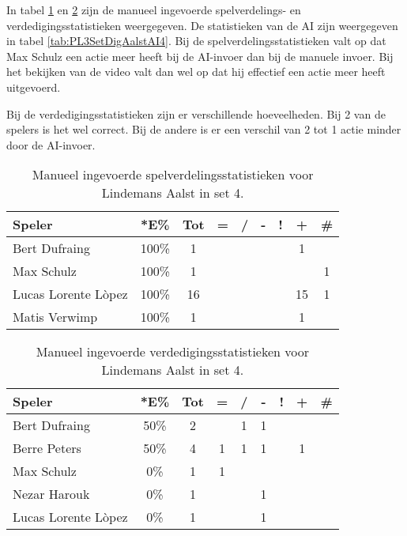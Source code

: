 In tabel \ref{tab:PL3SetAalstMan4} en \ref{tab:PL3DigAalstMan4} zijn de manueel ingevoerde spelverdelings- en verdedigingsstatistieken weergegeven. De statistieken van de AI zijn weergegeven in tabel \ref{tab:PL3SetDigAalstAI4}.
Bij de spelverdelingsstatistieken valt op dat Max Schulz een actie meer heeft bij de AI-invoer dan bij de manuele invoer. Bij het bekijken van de video valt dan wel op dat hij effectief een actie meer heeft uitgevoerd. 

Bij de verdedigingsstatistieken zijn er verschillende hoeveelheden. Bij 2 van de spelers is het wel correct. Bij de andere is er een verschil van 2 tot 1 actie minder door de AI-invoer.

\begin{table}[ht!]
    \centering
    \scriptsize
    \begin{tabular}{|l|c|c|c|c|c|c|c|c|}
        \hline
        \textbf{Speler} & *E\% & Tot & = & / & - & ! & + & \# \\ \hline
        Bert Dufraing & 100\% & 1 &  &  &  & & 1 &  \\ 
        Max Schulz & 100\% & 1 &  &  &  & & & 1 \\ 
        Lucas Lorente Lòpez & 100\% & 16 &  &  &  &  & 15 & 1 \\ 
        Matis Verwimp &100\% & 1 & & & & & 1 & \\\hline
    \end{tabular}
    \caption[Manueel ingevoerde spelverdelingsstatistieken voor Lindemans Aalst in set 4]{\label{tab:PL3SetAalstMan4}Manueel ingevoerde spelverdelingsstatistieken voor Lindemans Aalst in set 4.}
\end{table}

\begin{table}[ht!]
    \centering
    \scriptsize
    \begin{tabular}{|l|c|c|c|c|c|c|c|c|}
        \hline
        \textbf{Speler} & *E\% & Tot & = & / & - & ! & + & \# \\ \hline
        Bert Dufraing & 50\% & 2 &  & 1 & 1 &  &  & \\ 
        Berre Peters & 50\% & 4 & 1 & 1 & 1 & & 1 &  \\ 
        Max Schulz & 0\% & 1 & 1 &  &  &  &  & \\ 
        Nezar Harouk & 0\% & 1 &  &  & 1 &  &  &  \\ 
        Lucas Lorente Lòpez & 0\% & 1 &  &  & 1 &  &  & \\ \hline
    \end{tabular}
    \caption[Manueel ingevoerde verdedigingsstatistieken voor Lindemans Aalst in set 4]{\label{tab:PL3DigAalstMan4}Manueel ingevoerde verdedigingsstatistieken voor Lindemans Aalst in set 4.}
\end{table}

